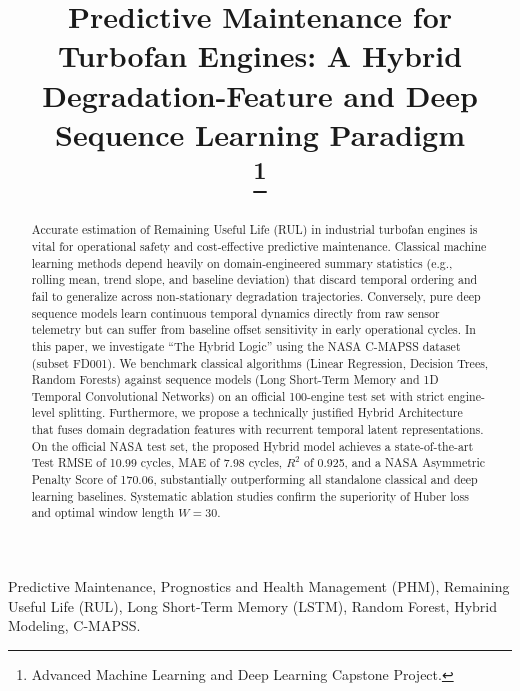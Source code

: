 \documentclass[conference]{IEEEtran}
\begin{document}
\title{Predictive Maintenance for Turbofan Engines: A Hybrid Degradation-Feature and Deep Sequence Learning Paradigm\\
\thanks{Advanced Machine Learning and Deep Learning Capstone Project.}
}

\author{
}

\maketitle

\begin{abstract}
Accurate estimation of Remaining Useful Life (RUL) in industrial turbofan engines is vital for operational safety and cost-effective predictive maintenance. Classical machine learning methods depend heavily on domain-engineered summary statistics (e.g., rolling mean, trend slope, and baseline deviation) that discard temporal ordering and fail to generalize across non-stationary degradation trajectories. Conversely, pure deep sequence models learn continuous temporal dynamics directly from raw sensor telemetry but can suffer from baseline offset sensitivity in early operational cycles. In this paper, we investigate ``The Hybrid Logic'' using the NASA C-MAPSS dataset (subset FD001). We benchmark classical algorithms (Linear Regression, Decision Trees, Random Forests) against sequence models (Long Short-Term Memory and 1D Temporal Convolutional Networks) on an official 100-engine test set with strict engine-level splitting. Furthermore, we propose a technically justified Hybrid Architecture that fuses domain degradation features with recurrent temporal latent representations. On the official NASA test set, the proposed Hybrid model achieves a state-of-the-art Test RMSE of 10.99 cycles, MAE of 7.98 cycles, $R^2$ of 0.925, and a NASA Asymmetric Penalty Score of 170.06, substantially outperforming all standalone classical and deep learning baselines. Systematic ablation studies confirm the superiority of Huber loss and optimal window length $W=30$.
\end{abstract}

\begin{IEEEkeywords}
Predictive Maintenance, Prognostics and Health Management (PHM), Remaining Useful Life (RUL), Long Short-Term Memory (LSTM), Random Forest, Hybrid Modeling, C-MAPSS.
\end{IEEEkeywords}
\end{document}
